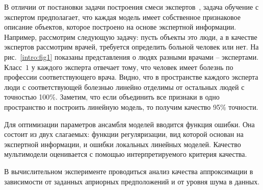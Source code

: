 \documentclass[12pt, twoside]{article}
\numberwithin{equation}{section}
\begin{document}
В отличии от постановки задачи построения смеси экспертов~\cite{Yuksel2012}, задача обучение с экспертом предполагает, что каждая модель имеет собственное признаковое описание объектов, которое построено на основе экспертной информации. Например, рассмотрим следующую задачу: пусть объекты это люди, а в качестве экспертов рассмотрим врачей, требуется определить больной человек или нет. На рис.~\ref{intro:fig1} показаны представления о людях разными врачами -- экспертами. Класс~$1$ у каждого эксперта отвечает тому, что человек имеет болезнь по профессии соответствующего врача. Видно, что в пространстве каждого эксперта люди с соответствующей болезнью линейно отделимы от остальных людей с точностью 100\%. Заметим, что если объединить все признаки в одно пространство и построить линейную модель, то получим качество 95\% точности. 

Для оптимизации параметров ансамбля моделей вводится функция ошибки. Она состоит из двух слагаемых: функции регуляризации, вид которой основан на экспертной информации, и ошибки локальных линейных моделей. Качество мультимодели оценивается с помощью интерпретируемого критерия качества.

В вычислительном эксперименте проводиться анализ качества аппроксимации в зависимости от заданных априорных предположений и от уровня шума в данных.
\end{document}
